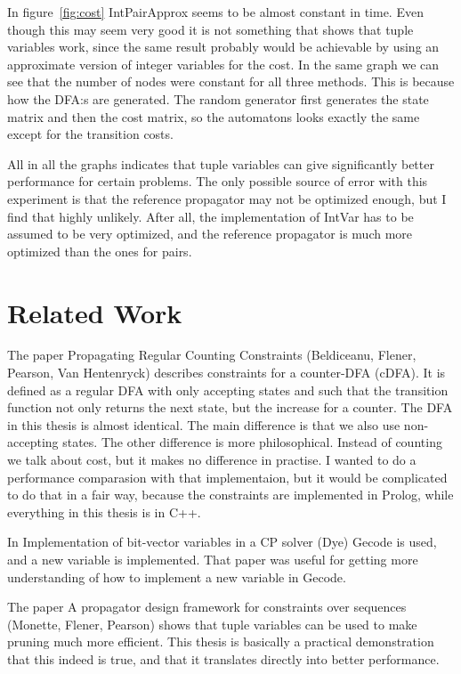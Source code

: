 \documentclass[a4paper,11pt]{article}
\begin{document}
In figure~\ref{fig:cost} IntPairApprox seems to be almost constant in time. Even though this may seem very good it is not something that shows that tuple variables work, since the same result probably would be achievable by using an approximate version of integer variables for the cost. In the same graph we can see that the number of nodes were constant for all three methods. This is because how the DFA:s are generated. The random generator first generates the state matrix and then the cost matrix, so the automatons looks exactly the same except for the transition costs.

All in all the graphs indicates that tuple variables can give significantly better performance for certain problems. The only possible source of error with this experiment is that the reference propagator may not be optimized enough, but I find that highly unlikely. After all, the implementation of IntVar has to be assumed to be very optimized, and the reference propagator is much more optimized than the ones for pairs.

\section{Related Work}
The paper Propagating Regular Counting Constraints (Beldiceanu, Flener, Pearson, Van Hentenryck) describes constraints for a counter-DFA (cDFA). It is defined as a regular DFA with only accepting states and such that the transition function not only returns the next state, but the increase for a counter. The DFA in this thesis is almost identical. The main difference is that we also use non-accepting states. The other difference is more philosophical. Instead of counting we talk about cost, but it makes no difference in practise. I wanted to do a performance comparasion with that implementaion, but it would be complicated to do that in a fair way, because the constraints are implemented in Prolog, while everything in this thesis is in C++.

In Implementation of bit-vector variables in a CP solver (Dye) Gecode is used, and a new variable is implemented. That paper was useful for getting more understanding of how to implement a new variable in Gecode.

The paper A propagator design framework for constraints over sequences (Monette, Flener, Pearson) shows that tuple variables can be used to make pruning much more efficient. This thesis is basically a practical demonstration that this indeed is true, and that it translates directly into better performance.
\end{document}
